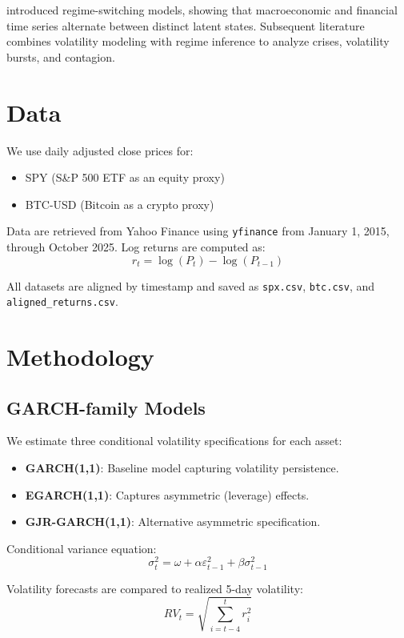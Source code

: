 \documentclass[12pt]{article}
\begin{document}
\citet{hamilton1989ms} introduced regime-switching models, showing that macroeconomic and financial time series alternate between distinct latent states. Subsequent literature combines volatility modeling with regime inference to analyze crises, volatility bursts, and contagion.

\FloatBarrier
\section{Data}
We use daily adjusted close prices for:
\begin{itemize}
    \item SPY (S\&P 500 ETF as an equity proxy)
    \item BTC-USD (Bitcoin as a crypto proxy)
\end{itemize}

Data are retrieved from Yahoo Finance using \texttt{yfinance} from January 1, 2015, through October 2025. Log returns are computed as:
\begin{equation}
r_t = \log(P_t) - \log(P_{t-1})
\end{equation}

All datasets are aligned by timestamp and saved as \texttt{spx.csv}, \texttt{btc.csv}, and \texttt{aligned\_returns.csv}.

\FloatBarrier
\section{Methodology}
\subsection{GARCH-family Models}
We estimate three conditional volatility specifications for each asset:
\begin{itemize}
    \item \textbf{GARCH(1,1)}: Baseline model capturing volatility persistence.
    \item \textbf{EGARCH(1,1)}: Captures asymmetric (leverage) effects.
    \item \textbf{GJR-GARCH(1,1)}: Alternative asymmetric specification.
\end{itemize}

Conditional variance equation:
\begin{equation}
\sigma_t^2 = \omega + \alpha \varepsilon_{t-1}^2 + \beta \sigma_{t-1}^2
\end{equation}

Volatility forecasts are compared to realized 5-day volatility:
\begin{equation}
RV_t = \sqrt{\sum_{i=t-4}^{t} r_i^2}
\end{equation}
\end{document}
